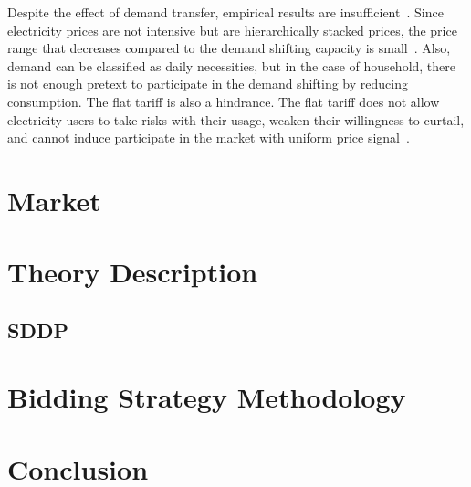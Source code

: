 \documentclass[journal]{IEEEtran} %
\begin{document}
Despite the effect of demand transfer, empirical results are insufficient~\cite{kirschen2003demand}. Since electricity prices are not intensive but are hierarchically stacked prices, the price range that decreases compared to the demand shifting capacity is small~\cite{kirschen2003demand}. Also, demand can be classified as daily necessities, but in the case of household, there is not enough pretext to participate in the demand shifting by reducing consumption. The flat tariff is also a hindrance. The flat tariff does not allow electricity users to take risks with their usage, weaken their willingness to curtail, and cannot induce participate in the market with uniform price signal~\cite{boeve2021asset}.

\section{Market}

\section{Theory Description}
\subsection{SDDP}

\section{Bidding Strategy Methodology}
\newpage








\section{Conclusion}


















\ifCLASSOPTIONcaptionsoff
  \newpage
\fi




\end{document}
